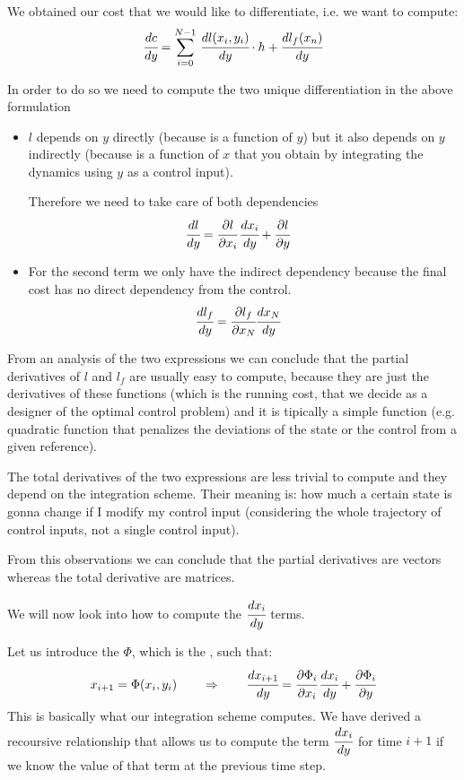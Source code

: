 We obtained our cost that we would like to differentiate, i.e. we want to compute:
\[
\cfrac{dc}{dy} =  \sum_{i=0}^{N-1}\,\cfrac{dl(x_i, y_i)}{dy}\cdot h + \cfrac{dl_f(x_n)}{dy}
\]

In order to do so we need to compute the two unique differentiation in the above formulation
\begin{itemize}
\item $l$ depends on $y$ directly (because is a function of $y$) but it also depends on $y$ indirectly (because is a function of $x$ that you obtain by integrating the dynamics using $y$ as a control input).

Therefore we need to take care of both dependencies
\begin{align*}
\cfrac{dl}{dy} &= \cfrac{\partial l}{\partial x_i}\,\cfrac{dx_i}{dy}  + \cfrac{\partial l}{\partial y}
\end{align*}
\item For the second term we only have the indirect dependency because the final cost has no direct dependency from the control.
\begin{align*}
\cfrac{dl_f}{dy} &= \cfrac{\partial l_f}{\partial x_N} \cfrac{dx_N}{dy}
\end{align*}
\end{itemize}
From an analysis of the two expressions we can conclude that the partial derivatives of $l$ and $l_f$ are usually easy to compute, because they are just the derivatives of these functions (which is the running cost, that we decide as a designer of the optimal control problem) and it is tipically a simple function (e.g. quadratic function that penalizes the deviations of the state or the control from a given reference).

The total derivatives of the two expressions are less trivial to compute and they depend on the integration scheme. Their meaning is: how much a certain state is gonna change if I modify my control input (considering the whole trajectory of control inputs, not a single control input).

From this observations we can conclude that the partial derivatives are vectors whereas the total derivative are matrices.

We will now look into how to compute the $\cfrac{dx_i}{dy}$ terms.

Let us introduce the  $\Phi$, which is the , such that:
\[x_{i+1} = \Phi(x_i, y_i)\qquad\Rightarrow \qquad\cfrac{dx_{i+1}}{dy} = \cfrac{\partial\Phi_i}{\partial x_i}\,\cfrac{dx_i}{dy} + \cfrac{\partial\Phi_i}{\partial y}\]
This is basically what our integration scheme computes. We have derived a recoursive relationship that allows us to compute the term $\cfrac{dx_i}{dy}$ for time $i+1$ if we know the value of that term  at the previous time step. 

